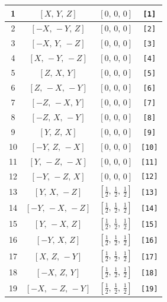 \documentclass[fleqn,8pt]{jsarticle}
\begin{document}
\begin{longtable}{cccc}
1 & $\left[ X,\, Y,\, Z \right]$ & $\left[ 0,\, 0,\, 0 \right]$ & {\tt [1]} \\ \hline
2 & $\left[ - X,\, - Y,\, Z \right]$ & $\left[ 0,\, 0,\, 0 \right]$ & {\tt [2]} \\ \hline
3 & $\left[ - X,\, Y,\, - Z \right]$ & $\left[ 0,\, 0,\, 0 \right]$ & {\tt [3]} \\ \hline
4 & $\left[ X,\, - Y,\, - Z \right]$ & $\left[ 0,\, 0,\, 0 \right]$ & {\tt [4]} \\ \hline
5 & $\left[ Z,\, X,\, Y \right]$ & $\left[ 0,\, 0,\, 0 \right]$ & {\tt [5]} \\ \hline
6 & $\left[ Z,\, - X,\, - Y \right]$ & $\left[ 0,\, 0,\, 0 \right]$ & {\tt [6]} \\ \hline
7 & $\left[ - Z,\, - X,\, Y \right]$ & $\left[ 0,\, 0,\, 0 \right]$ & {\tt [7]} \\ \hline
8 & $\left[ - Z,\, X,\, - Y \right]$ & $\left[ 0,\, 0,\, 0 \right]$ & {\tt [8]} \\ \hline
9 & $\left[ Y,\, Z,\, X \right]$ & $\left[ 0,\, 0,\, 0 \right]$ & {\tt [9]} \\ \hline
10 & $\left[ - Y,\, Z,\, - X \right]$ & $\left[ 0,\, 0,\, 0 \right]$ & {\tt [10]} \\ \hline
11 & $\left[ Y,\, - Z,\, - X \right]$ & $\left[ 0,\, 0,\, 0 \right]$ & {\tt [11]} \\ \hline
12 & $\left[ - Y,\, - Z,\, X \right]$ & $\left[ 0,\, 0,\, 0 \right]$ & {\tt [12]} \\ \hline
13 & $\left[ Y,\, X,\, - Z \right]$ & $\left[ \frac{1}{2},\, \frac{1}{2},\, \frac{1}{2} \right]$ & {\tt [13]} \\ \hline
14 & $\left[ - Y,\, - X,\, - Z \right]$ & $\left[ \frac{1}{2},\, \frac{1}{2},\, \frac{1}{2} \right]$ & {\tt [14]} \\ \hline
15 & $\left[ Y,\, - X,\, Z \right]$ & $\left[ \frac{1}{2},\, \frac{1}{2},\, \frac{1}{2} \right]$ & {\tt [15]} \\ \hline
16 & $\left[ - Y,\, X,\, Z \right]$ & $\left[ \frac{1}{2},\, \frac{1}{2},\, \frac{1}{2} \right]$ & {\tt [16]} \\ \hline
17 & $\left[ X,\, Z,\, - Y \right]$ & $\left[ \frac{1}{2},\, \frac{1}{2},\, \frac{1}{2} \right]$ & {\tt [17]} \\ \hline
18 & $\left[ - X,\, Z,\, Y \right]$ & $\left[ \frac{1}{2},\, \frac{1}{2},\, \frac{1}{2} \right]$ & {\tt [18]} \\ \hline
19 & $\left[ - X,\, - Z,\, - Y \right]$ & $\left[ \frac{1}{2},\, \frac{1}{2},\, \frac{1}{2} \right]$ & {\tt [19]} \\ \hline

\end{longtable}
\end{document}
